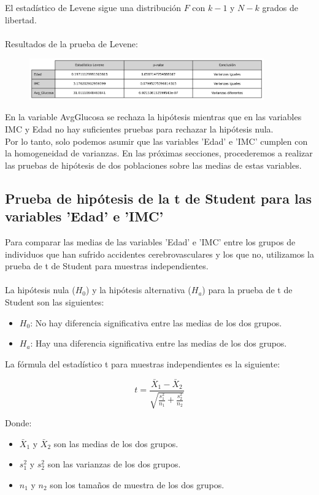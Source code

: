 \documentclass[a4paper, 12pt]{article}
\begin{document}
El estadístico de Levene sigue una distribución \( F \) con \( k - 1 \) y \( N - k \) grados de libertad.
\\ \\
Resultados de la prueba de Levene:
\begin{figure}[H]
    \centering
    \includegraphics[width=0.9\textwidth]{img/Tablas/prueba_varianzas_iguales.png}
\end{figure}
En la variable AvgGlucosa se rechaza la hipótesis mientras que en las variables IMC y Edad no hay suficientes pruebas para rechazar la hipótesis nula. \\
Por lo tanto, solo podemos asumir que las variables 'Edad' e 'IMC' cumplen con la homogeneidad de varianzas. En las próximas secciones, procederemos a realizar las pruebas de hipótesis de dos poblaciones sobre las medias de estas variables.

\subsection{Prueba de hipótesis de la t de Student para las variables 'Edad' e 'IMC'}

Para comparar las medias de las variables 'Edad' e 'IMC' entre los grupos de individuos que han sufrido accidentes cerebrovasculares y los que no, utilizamos la prueba de t de Student para muestras independientes.
\\ \\
La hipótesis nula (\(H_0\)) y la hipótesis alternativa (\(H_a\)) para la prueba de t de Student son las siguientes:
\begin{itemize}
    \item \(H_0\): No hay diferencia significativa entre las medias de los dos grupos.
    \item \(H_a\): Hay una diferencia significativa entre las medias de los dos grupos.
\end{itemize}

La fórmula del estadístico t para muestras independientes es la siguiente:

\[ t = \frac{\bar{X}_1 - \bar{X}_2}{\sqrt{\frac{s_1^2}{n_1} + \frac{s_2^2}{n_2}}} \]

Donde:
\begin{itemize}
    \item \(\bar{X}_1\) y \(\bar{X}_2\) son las medias de los dos grupos.
    \item \(s_1^2\) y \(s_2^2\) son las varianzas de los dos grupos.
    \item \(n_1\) y \(n_2\) son los tamaños de muestra de los dos grupos.
\end{itemize}
\end{document}

